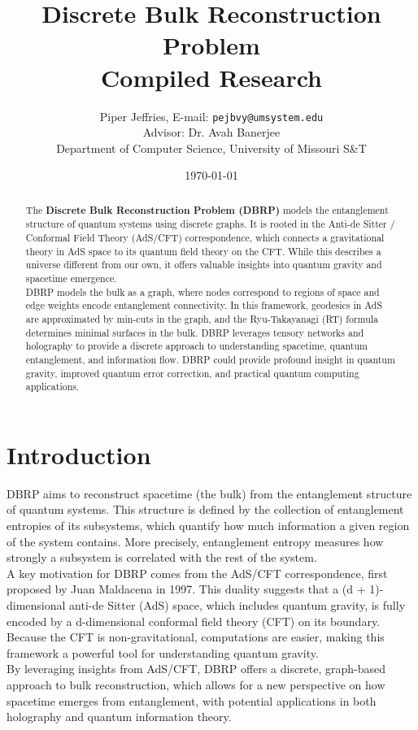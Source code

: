 \documentclass[12pt]{article}
\title{\textbf{Discrete Bulk Reconstruction Problem} \\ \large Compiled Research}
\author{\small{Piper Jeffries, E-mail:} \texttt{pejbvy@umsystem.edu} \\ \small{Advisor: Dr. Avah Banerjee} \\ \small{Department of Computer Science, University of Missouri S\&T}}
\date{\small{\today}}
\begin{document}
\maketitle

\begin{abstract}
    The \textbf{Discrete Bulk Reconstruction Problem (DBRP)} models the entanglement structure of quantum systems using discrete graphs. It is rooted in the Anti-de Sitter / Conformal Field Theory (AdS/CFT) correspondence, which connects a gravitational theory in AdS space to its quantum field theory on the CFT.
    While this describes a universe different from our own, it offers valuable insights into quantum gravity and spacetime emergence. 
    \\
    \indent DBRP models the bulk as a graph, where nodes correspond to regions of space and edge weights encode entanglement connectivity.
    In this framework, geodesics in AdS are approximated by min-cuts in the graph, and the Ryu-Takayanagi (RT) formula determines minimal surfaces in the bulk. DBRP leverages tensory networks and holography to provide a discrete approach to understanding spacetime, quantum entanglement, and information flow.
    DBRP could provide profound insight in quantum gravity, improved quantum error correction, and practical quantum computing applications.
\end{abstract}

\newpage 
\tableofcontents
\newpage

\section{Introduction}
    \hspace{0.5cm} DBRP aims to reconstruct spacetime (the bulk) from the entanglement structure of quantum systems. This structure is defined by the collection of entanglement entropies of its subsystems, which quantify how much information a given region of the system contains. More precisely, entanglement entropy measures how strongly a subsystem is correlated with the rest of the system.
    \\
    \indent A key motivation for DBRP comes from the AdS/CFT correspondence, first proposed by Juan Maldacena in 1997. This duality suggests that a (d + 1)-dimensional anti-de Sitter (AdS) space, which includes quantum gravity, is fully encoded by a d-dimensional conformal field theory (CFT) on its boundary. Because the CFT is non-gravitational, computations are easier, making this framework a powerful tool for understanding quantum gravity.
    \\
    \indent By leveraging insights from AdS/CFT, DBRP offers a discrete, graph-based approach to bulk reconstruction, which allows for a new perspective on how spacetime emerges from entanglement, with potential applications in both holography and quantum information theory.
\end{document}
